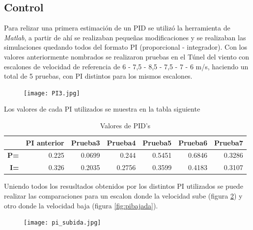        
    \subsection{Control}
    Para relizar una primera estimación de un PID se utilizó la herramienta de \textit{Matlab}, a partir de ahí se realizaban pequeñas modificaciones y se realizaban las simulaciones quedando todos del formato PI (proporcional - integrador).
    Con los valores anteriormente nombrados se realizaron pruebas en el Túnel del viento con escalones de velocidad de referencia de 6 - 7,5 - 8,5 - 7,5 - 7 - 6 m/s, haciendo un total de 5 pruebas, con PI distintos para los mismos escalones. 
    
    \begin{figure}[htb]
    	\centering
    	\texttt{[image: PI3.jpg]}
    	\label{fig:PI3}
    \end{figure}
    
    Los valores de cada PI utilizados se muestra en la tabla siguiente
    \begin{table}[h]
    	\centering
    	\begin{tabular}{r|r|r|r|r|r|r|}
    		\cline{2-7}
    		\multicolumn{1}{l|}{} & \multicolumn{1}{c|}{\textbf{PI anterior}} & \multicolumn{1}{c|}{\textbf{Prueba3}} & \multicolumn{1}{c|}{\textbf{Prueba4}} & \multicolumn{1}{c|}{\textbf{Prueba5}} & \multicolumn{1}{c|}{\textbf{Prueba6}} & \multicolumn{1}{c|}{\textbf{Prueba7}} \\ \hline
    		\multicolumn{1}{|r|}{\textbf{P=}} & 0.225 & 0.0699 & 0.244 & 0.5451 & 0.6846 & 0.3286 \\ \hline
    		\multicolumn{1}{|r|}{\textbf{I=}} & 0.326 & 0.2035 & 0.2756 & 0.3599 & 0.4183 & 0.3107 \\ \hline
    	\end{tabular}
    \caption{Valores de PID's}
    \end{table}
    
    Uniendo todos los resusltados obtenidos por los distintos PI utilizados se puede realizar las comparaciones para un escalon donde la velocidad sube (figura \ref{fig:pisubuda}) y otro donde la velocidad baja (figura \ref{fig:pibajada}).
    
    \begin{figure}[h!]
    	\centering
    	\texttt{[image: pi\_subida.jpg]}
    	\label{fig:pisubuda}
    \end{figure}
    
